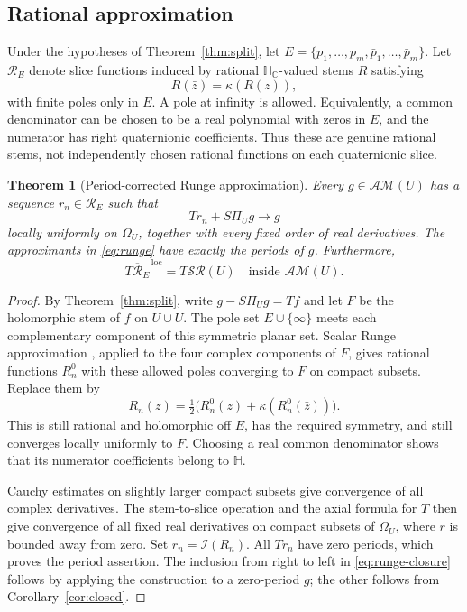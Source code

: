 \documentclass[11pt,a4paper]{article}
\numberwithin{equation}{section}
\newtheorem{theorem}{Theorem}[section]
\theoremstyle{definition}
\theoremstyle{remark}
\newcommand{\C}{\mathbb C}
\newcommand{\HH}{\mathbb H}
\newcommand{\HC}{\mathbb H_{\C}}
\newcommand{\SR}{\mathcal{SR}}
\newcommand{\AM}{\mathcal{AM}}
\newcommand{\cI}{\mathcal I}
\begin{document}
\subsection{Rational approximation}
Under the hypotheses of Theorem~\ref{thm:split}, let
$E=\{p_1,\ldots,p_m,\bar p_1,\ldots,\bar p_m\}$.
Let $\mathcal R_E$ denote slice functions induced by rational $\HC$-valued
stems $R$ satisfying
\[
 R(\bar z)=\kappa(R(z)),
\]
with finite poles only in $E$. A pole at infinity is allowed. Equivalently,
a common denominator can be chosen to be a real polynomial with zeros in
$E$, and the numerator has right quaternionic coefficients. Thus these are
genuine rational stems, not independently chosen rational functions on each
quaternionic slice.

\begin{theorem}[Period-corrected Runge approximation]\label{thm:runge}
Every $g\in\AM(U)$ has a sequence $r_n\in\mathcal R_E$ such that
\begin{equation}
 T r_n+S\Pi_Ug\longrightarrow g
 \label{eq:runge}
\end{equation}
locally uniformly on $\Omega_U$, together with every fixed order of real
derivatives. The approximants in \eqref{eq:runge} have exactly the periods of
$g$. Furthermore,
\begin{equation}
 \overline{T\mathcal R_E}^{\,\mathrm{loc}}=T\SR(U)
 \quad\text{inside }\AM(U).
 \label{eq:runge-closure}
\end{equation}
\end{theorem}
\begin{proof}
By Theorem~\ref{thm:split}, write $g-S\Pi_Ug=Tf$ and let $F$ be the
holomorphic stem of $f$ on $U\cup\bar U$. The pole set $E\cup\{\infty\}$
meets each complementary component of this symmetric planar set. Scalar
Runge approximation \cite{Runge}, applied to the four complex components of
$F$, gives rational functions $R_n^0$ with these allowed poles converging to
$F$ on compact subsets. Replace them by
\[
 R_n(z)=\tfrac12\bigl(R_n^0(z)+\kappa(R_n^0(\bar z))\bigr).
\]
This is still rational and holomorphic off $E$, has the required symmetry,
and still converges locally uniformly to $F$. Choosing a real common
denominator shows that its numerator coefficients belong to $\HH$.

Cauchy estimates on slightly larger compact subsets give convergence of all
complex derivatives. The stem-to-slice operation and the axial formula for
$T$ then give convergence of all fixed real derivatives on compact subsets of
$\Omega_U$, where $r$ is bounded away from zero. Set $r_n=\cI(R_n)$.
All $Tr_n$ have zero periods, which proves the period assertion.
The inclusion from right to left in \eqref{eq:runge-closure} follows by
applying the construction to a zero-period $g$; the other follows from
Corollary~\ref{cor:closed}.
\end{proof}
\end{document}
